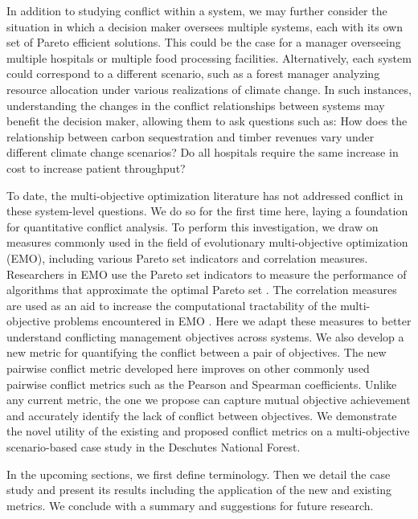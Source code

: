 In addition to studying conflict within a system, we may further consider the situation in which a decision maker oversees multiple systems, each with its own set of Pareto efficient solutions. This could be the case for a manager overseeing multiple hospitals or multiple food processing facilities. Alternatively, each system could correspond to a different scenario, such as a forest manager analyzing resource allocation under various realizations of climate change. In such instances, understanding the changes in the conflict relationships between systems may benefit the decision maker, allowing them to ask questions such as: How does the relationship between carbon sequestration and timber revenues vary under different climate change scenarios? Do all hospitals require the same increase in cost to increase patient throughput?

To date, the multi-objective optimization literature has not addressed conflict in these system-level questions. We do so for the first time here, laying a foundation for quantitative conflict analysis. To perform this investigation, we draw on measures commonly used in the field of evolutionary multi-objective optimization (EMO), including various Pareto set indicators and correlation measures. Researchers in EMO use the Pareto set indicators to measure the performance of algorithms that approximate the optimal Pareto set \cite{zitzler2003performance}. The correlation measures are used as an aid to increase the computational tractability of the multi-objective problems encountered in EMO \cite{brockhoff2006all}. Here we adapt these measures to better understand conflicting management objectives across systems. We also develop a new metric for quantifying the conflict between a pair of objectives. The new pairwise conflict metric developed here improves on other commonly used pairwise conflict metrics such as the Pearson and Spearman coefficients. Unlike any current metric, the one we propose can capture mutual objective achievement and accurately identify the lack of conflict between objectives. We demonstrate the novel utility of the existing and proposed conflict metrics on a multi-objective scenario-based case study in the Deschutes National Forest.

In the upcoming sections, we first define terminology. Then we detail the case study and present its results including the application of the new and existing metrics. We conclude with a summary and suggestions for future research.